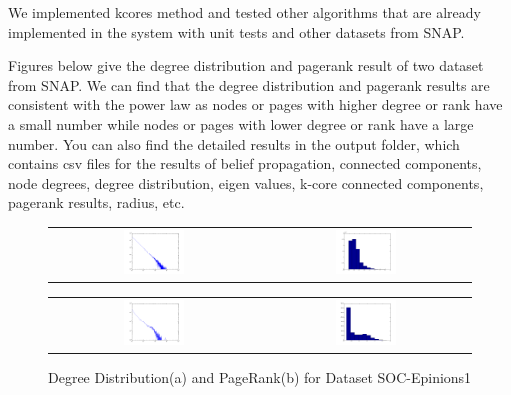 We implemented kcores method
and tested other algorithms that are already implemented in the system with unit tests and other datasets from SNAP.

Figures below give the degree distribution and pagerank result of two dataset from SNAP. We can find that the degree distribution and pagerank results are consistent with the power law as nodes or pages with higher degree or rank have a small number while nodes or pages with lower degree or rank have a large number.
You can also find the detailed results in the output folder, which contains csv files for the results of belief propagation, connected components, node degrees, degree distribution, eigen values, k-core connected components, pagerank results, radius, etc. 


\begin{figure}[H]
\begin{center}
\begin{tabular}{cc}
     \includegraphics[width=0.3\textwidth]{FIG/soc-degreedist.png} &
     \includegraphics[width=0.3\textwidth]{FIG/soc-pagerank.png} \\
\end{tabular}
\caption{Degree Distribution(a) and PageRank(b) for Dataset SOC-Epinions1}

\begin{tabular}{cc}
\includegraphics[width=0.3\textwidth]{FIG/wiki-degreedist.png} &
     \includegraphics[width=0.3\textwidth]{FIG/wiki-pagerank.png} \\


\end{tabular}
\end{center}
\end{figure}
